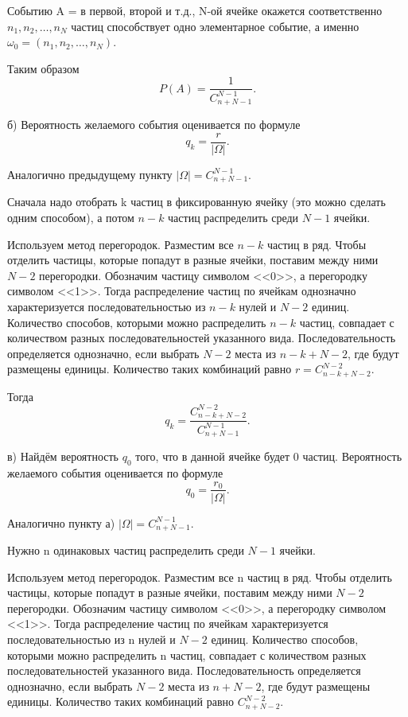 \documentclass{book}
\begin{document}
Событию A = { в первой, второй и т.д., N-ой ячейке окажется соответственно $ n_1, n_2, \dotsc , n_N $ частиц}
способствует одно элементарное событие, а именно
$ \omega_0 = \left( n_1, n_2, \dotsc , n_N \right) $.

Таким образом
$$ P(A) =
\frac{1}{C_{n+N-1}^{N-1}}. $$

б) Вероятность желаемого события оценивается по формуле
$$ q_k =
\frac{r}{| \Omega |}.$$

Аналогично предыдущему пункту $  | \Omega | = C_{n+N-1}^{N-1}  $.

Сначала надо отобрать k частиц в фиксированную ячейку (это можно сделать одним способом), а потом
$ n - k $
частиц распределить среди
$ N - 1 $ ячейки.

Используем метод перегородок.
Разместим все $ n - k $ частиц в ряд.
Чтобы отделить частицы, которые попадут в разные ячейки, поставим между ними $ N - 2 $ перегородки.
Обозначим частицу символом <<0>>, а перегородку символом <<1>>.
Тогда распределение частиц по ячейкам однозначно характеризуется последовательностью из $ n - k $ нулей и $ N - 2$ единиц.
Количество способов, которыми можно распределить
$ n - k $
частиц, совпадает с количеством разных последовательностей указанного вида.
Последовательность определяется однозначно, если выбрать $ N - 2 $ места из $ n - k + N - 2 $, где будут размещены единицы.
Количество таких комбинаций равно $ r = C_{n-k+N-2}^{N-2} $.

Тогда
$$ q_k =
\frac{C_{n-k+N-2}^{N-2}}{C_{n+N-1}^{N-1}}.$$

в) Найдём вероятность $ q_0 $ того, что в данной ячейке будет 0 частиц.
Вероятность желаемого события оценивается по формуле
$$ q_0 =
\frac{r_0}{| \Omega |}.$$

Аналогично пункту а) $  | \Omega | = C_{n+N-1}^{N-1}  $.

Нужно n одинаковых частиц распределить среди $ N - 1 $ ячейки.

Используем метод перегородок.
Разместим все n частиц в ряд.
Чтобы отделить частицы, которые попадут в разные ячейки, поставим между ними $ N - 2 $ перегородки.
Обозначим частицу символом <<0>>, а перегородку символом <<1>>.
Тогда распределение частиц по ячейкам характеризуется последовательностью из n нулей и $ N - 2 $ единиц.
Количество способов, которыми можно распределить n частиц, совпадает с количеством разных последовательностей указанного вида.
Последовательность определяется однозначно, если выбрать $ N - 2 $ места из $ n + N - 2 $, где будут размещены единицы.
Количество таких комбинаций равно $ C_{n+N-2}^{N-2} $.
\end{document}
